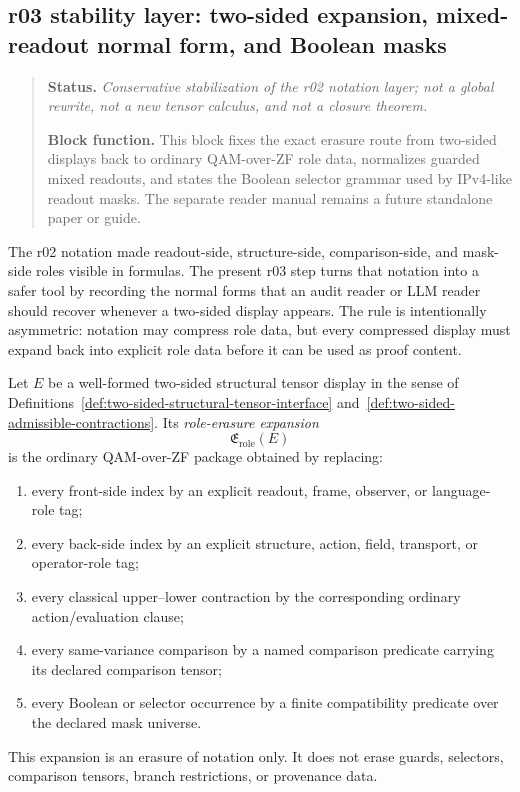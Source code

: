 \subsection*{r03 stability layer: two-sided expansion, mixed-readout normal form, and Boolean masks}
\begin{quote}\small
\noindent\textbf{Status.} \emph{Conservative stabilization of the r02 notation layer; not a global rewrite, not a new tensor calculus, and not a closure theorem.}\par
\noindent\textbf{Block function.} This block fixes the exact erasure route from two-sided displays back to ordinary QAM-over-ZF role data, normalizes guarded mixed readouts, and states the Boolean selector grammar used by IPv4-like readout masks.  The separate reader manual remains a future standalone paper or guide.
\end{quote}

The r02 notation made readout-side, structure-side, comparison-side, and mask-side roles visible in formulas.  The present r03 step turns that notation into a safer tool by recording the normal forms that an audit reader or LLM reader should recover whenever a two-sided display appears.  The rule is intentionally asymmetric: notation may compress role data, but every compressed display must expand back into explicit role data before it can be used as proof content.

\begin{definition}\label{def:r03-two-sided-role-erasure-map}
Let \(E\) be a well-formed two-sided structural tensor display in the sense of Definitions~\ref{def:two-sided-structural-tensor-interface} and~\ref{def:two-sided-admissible-contractions}.  Its \emph{role-erasure expansion}
\[
\mathfrak{E}_{\mathrm{role}}(E)
\]
is the ordinary QAM-over-ZF package obtained by replacing:
\begin{enumerate}[leftmargin=2em]
  \item every front-side index by an explicit readout, frame, observer, or language-role tag;
  \item every back-side index by an explicit structure, action, field, transport, or operator-role tag;
  \item every classical upper--lower contraction by the corresponding ordinary action/evaluation clause;
  \item every same-variance comparison by a named comparison predicate carrying its declared comparison tensor;
  \item every Boolean or selector occurrence by a finite compatibility predicate over the declared mask universe.
\end{enumerate}
This expansion is an erasure of notation only.  It does not erase guards, selectors, comparison tensors, branch restrictions, or provenance data.
\end{definition}

